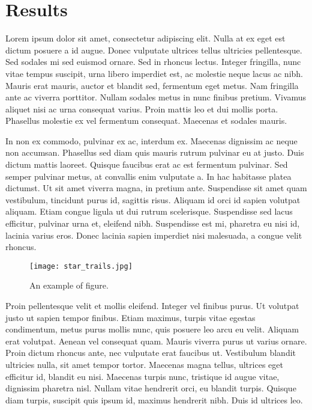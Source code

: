 
\chapter{Results}

Lorem ipsum dolor sit amet, consectetur adipiscing elit. Nulla at ex eget est dictum posuere a id augue. Donec vulputate ultrices tellus ultricies pellentesque. Sed sodales mi sed euismod ornare. Sed in rhoncus lectus. Integer fringilla, nunc vitae tempus suscipit, urna libero imperdiet est, ac molestie neque lacus ac nibh. Mauris erat mauris, auctor et blandit sed, fermentum eget metus. Nam fringilla ante ac viverra porttitor. Nullam sodales metus in nunc finibus pretium. Vivamus aliquet nisi ac urna consequat varius. Proin mattis leo et dui mollis porta. Phasellus molestie ex vel fermentum consequat. Maecenas et sodales mauris.

In non ex commodo, pulvinar ex ac, interdum ex. Maecenas dignissim ac neque non accumsan. Phasellus sed diam quis mauris rutrum pulvinar eu at justo. Duis dictum mattis laoreet. Quisque faucibus erat ac est fermentum pulvinar. Sed semper pulvinar metus, at convallis enim vulputate a. In hac habitasse platea dictumst. Ut sit amet viverra magna, in pretium ante. Suspendisse sit amet quam vestibulum, tincidunt purus id, sagittis risus. Aliquam id orci id sapien volutpat aliquam. Etiam congue ligula ut dui rutrum scelerisque. Suspendisse sed lacus efficitur, pulvinar urna et, eleifend nibh. Suspendisse est mi, pharetra eu nisi id, lacinia varius eros. Donec lacinia sapien imperdiet nisi malesuada, a congue velit rhoncus.


\begin{figure}
	\texttt{[image: star\_trails.jpg]} 
	\caption[Example Figure]{An example of figure.}
\label{example_figure}
\end{figure}

Proin pellentesque velit et mollis eleifend. Integer vel finibus purus. Ut volutpat justo ut sapien tempor finibus. Etiam maximus, turpis vitae egestas condimentum, metus purus mollis nunc, quis posuere leo arcu eu velit. Aliquam erat volutpat. Aenean vel consequat quam. Mauris viverra purus ut varius ornare. Proin dictum rhoncus ante, nec vulputate erat faucibus ut. Vestibulum blandit ultricies nulla, sit amet tempor tortor. Maecenas magna tellus, ultrices eget efficitur id, blandit eu nisi. Maecenas turpis nunc, tristique id augue vitae, dignissim pharetra nisl. Nullam vitae hendrerit orci, eu blandit turpis. Quisque diam turpis, suscipit quis ipsum id, maximus hendrerit nibh. Duis id ultrices leo.

